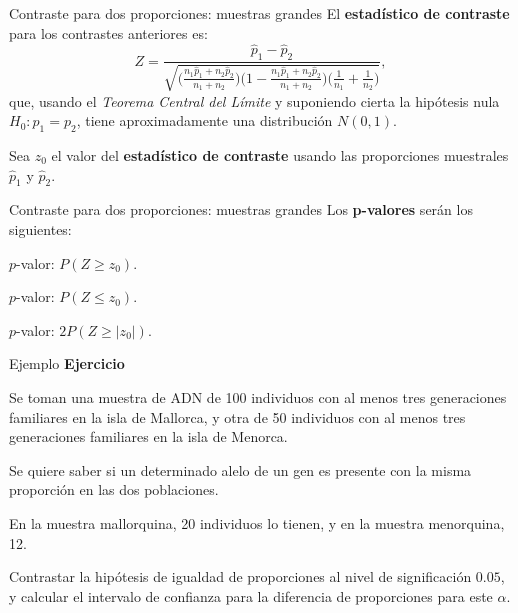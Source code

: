 \documentclass[
  ignorenonframetext,
]{beamer}
\begin{document}
\begin{frame}{Contraste para dos proporciones: muestras grandes}
\protect\hypertarget{contraste-para-dos-proporciones-muestras-grandes-2}{}
El \textbf{estadístico de contraste} para los contrastes anteriores es:
\[Z=\frac{\widehat{p}_1 -\widehat{p}_2}{
\sqrt{\Big(\frac{n_1 \widehat{p}_1 +n_2 \widehat{p}_2}{n_1
+n_2}\Big)\Big(1-\frac{n_1 \widehat{p}_1 +n_2 \widehat{p}_2}{n_1
+n_2}\Big)\Big(\frac1{n_1}+\frac1{n_2}
\Big)}},\] que, usando el \emph{Teorema Central del Límite} y suponiendo
cierta la hipótesis nula \(H_0:p_1=p_2\), tiene aproximadamente una
distribución \(N(0,1)\).

Sea \(z_0\) el valor del \textbf{estadístico de contraste} usando las
proporciones muestrales \(\widehat{p}_1\) y \(\widehat{p}_2\).
\end{frame}

\begin{frame}{Contraste para dos proporciones: muestras grandes}
\protect\hypertarget{contraste-para-dos-proporciones-muestras-grandes-3}{}
Los \textbf{p-valores} serán los siguientes:

\(p\)-valor: \(P(Z\geq z_0)\).

\(p\)-valor: \(P(Z\leq z_0)\).

\(p\)-valor: \(2 P(Z \geq |z_0|)\).
\end{frame}

\begin{frame}{Ejemplo}
\protect\hypertarget{ejemplo-41}{}
\textbf{Ejercicio}

Se toman una muestra de ADN de 100 individuos con al menos tres
generaciones familiares en la isla de Mallorca, y otra de 50 individuos
con al menos tres generaciones familiares en la isla de Menorca.

Se quiere saber si un determinado alelo de un gen es presente con la
misma proporción en las dos poblaciones.

En la muestra mallorquina, 20 individuos lo tienen, y en la muestra
menorquina, 12.

Contrastar la hipótesis de igualdad de proporciones al nivel de
significación \(0.05\), y calcular el intervalo de confianza para la
diferencia de proporciones para este \(\alpha\).
\end{frame}
\end{document}
